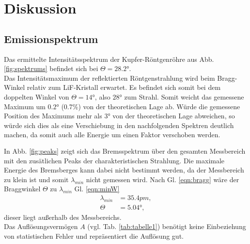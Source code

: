\newpage
\section{Diskussion}
\subsection{Emissionspektrum}
Das ermittelte Intensitätsspektrum der Kupfer-Röntgenröhre aus Abb. \ref{fig:spektrums}
befindet sich bei $\Theta=28.2°$.\\
Das Intensitätsmaximum der reflektierten Röntgenstrahlung wird beim Bragg-Winkel relativ
zum LiF-Kristall erwartet. Es befindet sich somit bei dem doppelten Winkel von $\Theta=14°$, also $28$° 
zum Strahl. Somit weicht das gemessene Maximum um $0.2°$ (0.7\%) von der theoretischen Lage ab.
Würde die gemessene Position des Maximums mehr als 3° von der theoretischen Lage abweichen, so
würde sich dies als eine Verschiebung in den nachfolgenden Spektren deutlich machen, da somit auch alle Energie
um einen Faktor verschoben werden.

In Abb. \ref{fig:peaks} zeigt sich das Bremsspektrum über den gesamten Messbereich mit
den zusätlichen Peaks der charakteristischen Strahlung. Die maximale Energie des Bremsberges
kann dabei nicht bestimmt werden, da der Messbereich zu klein ist und somit  $\lambda_{min}$ 
nicht gemessen wird. Nach Gl. \ref{eqn:bragg} wäre der Braggwinkel $\Theta$ zu $\lambda_{min}$ Gl. \ref{eqn:minW}
\begin{align*}
    \lambda_{min}&=35.4\si{pm},\\
    \Theta&=5.04°,
\end{align*}
dieser liegt außerhalb des Messbereichs.\\
Das Auflösungsvermögen $A$ (vgl. Tab. \ref{tab:tabelle1}) benötigt keine Einbeziehung von statistischen
Fehler und repräsentiert die Auflösung gut.\\


